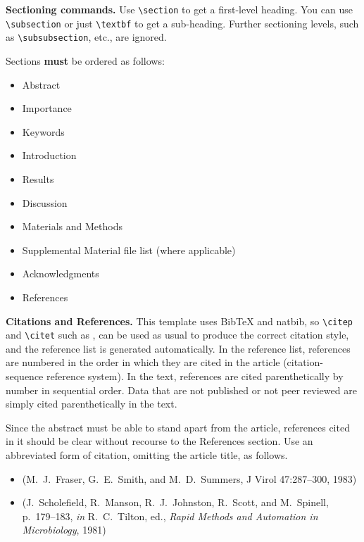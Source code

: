 \documentclass[lineno]{asm-article}
\begin{document}
\textbf{Sectioning commands.}
Use \verb|\section| to get a first-level heading. You can use \verb|\subsection| or just \verb|\textbf| to get a sub-heading. Further sectioning levels, such as \verb|\subsubsection|, etc., are ignored.

Sections \textbf{must} be ordered as follows:

\begin{itemize}
\item Abstract
\item Importance
\item Keywords
\item Introduction
\item Results
\item Discussion
\item Materials and Methods
\item Supplemental Material file list (where applicable)
\item Acknowledgments
\item References
\end{itemize}

\textbf{Citations and References.} 
This template uses BibTeX and natbib, so \verb|\citep| and \verb|\citet| such as \citep{coxInPress}, \citet{Aivazian917} can be used as usual to produce the correct citation style, and the reference list is generated automatically. In the reference list, references are numbered in the order in which they are cited in the article (citation-sequence reference system). In the text, references are cited parenthetically by number in sequential order. Data that are not published or not peer reviewed are simply cited parenthetically in the text.

Since the abstract must be able to stand apart from the article, references cited in it should be clear without recourse to the References section. Use an abbreviated form of citation, omitting the article title, as follows.

\begin{itemize}
\item (M.~J.~Fraser, G.~E.~Smith, and M.~D.~Summers, J Virol
47:287--300, 1983)
\item (J.~Scholefield, R.~Manson, R.~J.~Johnston, R.~Scott, and M.~Spinell, p.~179--183, \textit{in} R.~C.~Tilton, ed., \textit{Rapid Methods and Automation in Microbiology}, 1981)
\end{itemize}
\end{document}

